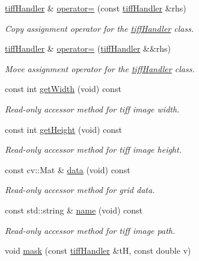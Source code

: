 \begin{DoxyCompactItemize}
\hyperlink{classtiffHandler}{tiff\+Handler} \& \hyperlink{classtiffHandler_aa48648c589647b32caf342d912d3353e}{operator=} (const \hyperlink{classtiffHandler}{tiff\+Handler} \&rhs)
\begin{DoxyCompactList}\small\item\em Copy assignment operator for the \hyperlink{classtiffHandler}{tiff\+Handler} class. \end{DoxyCompactList}\item 
\hyperlink{classtiffHandler}{tiff\+Handler} \& \hyperlink{classtiffHandler_a9e7baaba5bdbb6923328be7be47b2b85}{operator=} (\hyperlink{classtiffHandler}{tiff\+Handler} \&\&rhs)
\begin{DoxyCompactList}\small\item\em Move assignment operator for the \hyperlink{classtiffHandler}{tiff\+Handler} class. \end{DoxyCompactList}\item 
const int \hyperlink{classtiffHandler_a331aa1ba8bdb2f337f6272e85e38e620}{get\+Width} (void) const
\begin{DoxyCompactList}\small\item\em Read-\/only accessor method for tiff image width. \end{DoxyCompactList}\item 
const int \hyperlink{classtiffHandler_a6e5e39cefdee5f9712a512ddb80af2a6}{get\+Height} (void) const
\begin{DoxyCompactList}\small\item\em Read-\/only accessor method for tiff image height. \end{DoxyCompactList}\item 
const cv\+::\+Mat \& \hyperlink{classtiffHandler_aa534e76fcbedbc1153f1b61661d4d8c2}{data} (void) const
\begin{DoxyCompactList}\small\item\em Read-\/only accessor method for grid data. \end{DoxyCompactList}\item 
const std\+::string \& \hyperlink{classtiffHandler_add034c87811bd7c35234fdd3b2a0ada7}{name} (void) const
\begin{DoxyCompactList}\small\item\em Read-\/only accessor method for tiff image path. \end{DoxyCompactList}\item 
void \hyperlink{classtiffHandler_a316fecb1eba714d89b378570227a9e41}{mask} (const \hyperlink{classtiffHandler}{tiff\+Handler} \&tH, const double v)

\end{DoxyCompactItemize}
